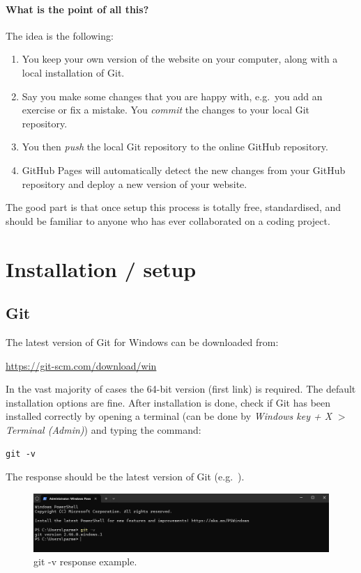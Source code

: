 \documentclass[a4paper,10pt]{article}
\begin{document}
\paragraph{What is the point of all this?} The idea is the following:
\begin{enumerate}
    \item You keep your own version of the website on your computer, along with a local installation of Git.
    \item Say you make some changes that you are happy with, e.g.\ you add an exercise or fix a mistake. You \emph{commit} the changes to your local Git repository.
    \item You then \emph{push} the local Git repository to the online GitHub repository.
    \item GitHub Pages will automatically detect the new changes from your GitHub repository and deploy a new version of your website.
\end{enumerate}
The good part is that once setup this process is totally free, standardised, and should be familiar to anyone who has ever collaborated on a coding project. 

\section{Installation / setup}

\subsection{Git}

The latest version of Git for Windows can be downloaded from:

\url{https://git-scm.com/download/win}

In the vast majority of cases the 64-bit version (first link) is required. The default installation options are fine. After installation is done, check if Git has been installed correctly by opening a terminal (can be done by \emph{Windows key + X} $>$ \emph{Terminal (Admin)}) and typing the command: 

\texttt{git -v}

The response should be the latest version of Git (e.g.\ ). 

\begin{figure}[htbp]
    \centering
    \includegraphics[width=\textwidth]{git-v.png}
    \caption{git -v response example.}
    \label{git-v}   
\end{figure}
\end{document}
